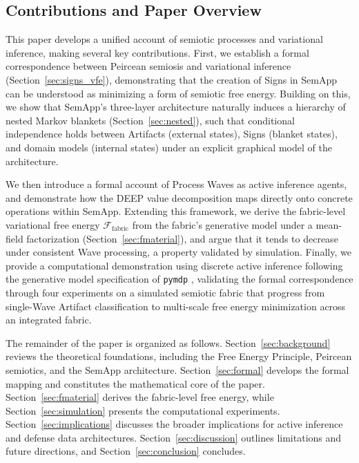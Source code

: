 \documentclass[11pt,a4paper]{article}
\theoremstyle{definition}
\begin{document}
\subsection{Contributions and Paper Overview}
\label{sec:contributions}

This paper develops a unified account of semiotic processes and variational inference, making several key contributions. First, we establish a formal correspondence between Peircean semiosis and variational inference (Section~\ref{sec:signs_vfe}), demonstrating that the creation of Signs in SemApp can be understood as minimizing a form of semiotic free energy. Building on this, we show that SemApp's three-layer architecture naturally induces a hierarchy of nested Markov blankets (Section~\ref{sec:nested}), such that conditional independence holds between Artifacts (external states), Signs (blanket states), and domain models (internal states) under an explicit graphical model of the architecture.

We then introduce a formal account of Process Waves as active inference agents, and demonstrate how the DEEP value decomposition \citep{constant2019regimes} maps directly onto concrete operations within SemApp. Extending this framework, we derive the fabric-level variational free energy $\mathcal{F}_{\text{fabric}}$ from the fabric's generative model under a mean-field factorization (Section~\ref{sec:fmaterial}), and argue that it tends to decrease under consistent Wave processing, a property validated by simulation. Finally, we provide a computational demonstration using discrete active inference following the generative model specification of \texttt{pymdp} \citep{heins2022pymdp}, validating the formal correspondence through four experiments on a simulated semiotic fabric that progress from single-Wave Artifact classification to multi-scale free energy minimization across an integrated fabric.

The remainder of the paper is organized as follows. Section~\ref{sec:background} reviews the theoretical foundations, including the Free Energy Principle, Peircean semiotics, and the SemApp architecture. Section~\ref{sec:formal} develops the formal mapping and constitutes the mathematical core of the paper. Section~\ref{sec:fmaterial} derives the fabric-level free energy, while Section~\ref{sec:simulation} presents the computational experiments. Section~\ref{sec:implications} discusses the broader implications for active inference and defense data architectures. Section~\ref{sec:discussion} outlines limitations and future directions, and Section~\ref{sec:conclusion} concludes.
\end{document}
